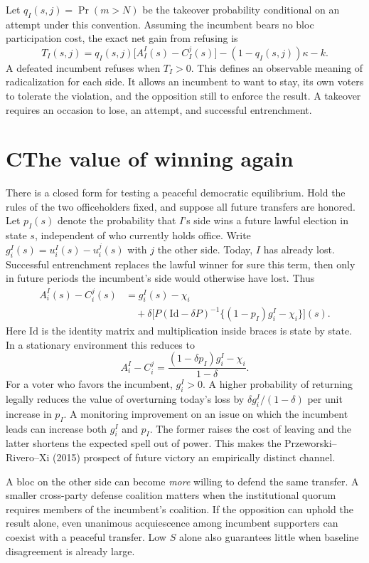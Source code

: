 \documentclass[11pt,letterpaper]{article}
\newcommand{\sect}[1]{\section*{\color{ink}#1}}
\newcommand{\Prb}{\operatorname{Pr}}
\begin{document}
Let $q_I(s,j)=\Prb(m>N)$ be the takeover probability conditional on an attempt under this convention. Assuming the incumbent bears no bloc participation cost, the exact net gain from refusing is
\begin{equation}
 T_I(s,j)=q_I(s,j)\big[A_I^I(s)-C_I^j(s)\big]-(1-q_I(s,j))\kappa-k.
\end{equation}
A defeated incumbent refuses when $T_I>0$. This defines an observable meaning of radicalization for each side. It allows an incumbent to want to stay, its own voters to tolerate the violation, and the opposition still to enforce the result. A takeover requires an occasion to lose, an attempt, and successful entrenchment.

\newpage
\sect{C\quad The value of winning again}
There is a closed form for testing a peaceful democratic equilibrium. Hold the rules of the two officeholders fixed, and suppose all future transfers are honored. Let $p_I(s)$ denote the probability that $I$'s side wins a future lawful election in state $s$, independent of who currently holds office. Write $g_i^I(s)=u_i^I(s)-u_i^j(s)$ with $j$ the other side. Today, $I$ has already lost. Successful entrenchment replaces the lawful winner for sure this term, then only in future periods the incumbent's side would otherwise have lost. Thus
\begin{align*}
 A_i^I(s)-C_i^j(s)
  &=g_i^I(s)-\chi_i\\[-2pt]
  &\quad+\delta\big[P(\mathrm{Id}-\delta P)^{-1}
    \{(1-p_I)g_i^I-\chi_i\}\big](s).
\end{align*}
Here $\mathrm{Id}$ is the identity matrix and multiplication inside braces is state by state. In a stationary environment this reduces to
\begin{equation}
 A_i^I-C_i^j=\frac{(1-\delta p_I)g_i^I-\chi_i}{1-\delta}.
\end{equation}
For a voter who favors the incumbent, $g_i^I>0$. A higher probability of returning legally reduces the value of overturning today's loss by $\delta g_i^I/(1-\delta)$ per unit increase in $p_I$. A monitoring improvement on an issue on which the incumbent leads can increase both $g_i^I$ and $p_I$. The former raises the cost of leaving and the latter shortens the expected spell out of power. This makes the Przeworski--Rivero--Xi (2015) prospect of future victory an empirically distinct channel.

A bloc on the other side can become \emph{more} willing to defend the same transfer. A smaller cross-party defense coalition matters when the institutional quorum requires members of the incumbent's coalition. If the opposition can uphold the result alone, even unanimous acquiescence among incumbent supporters can coexist with a peaceful transfer. Low $S$ alone also guarantees little when baseline disagreement is already large.
\end{document}
